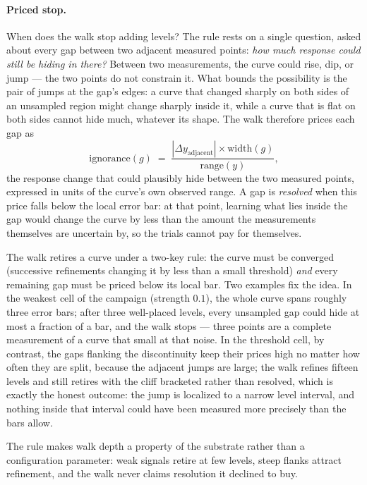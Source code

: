 \documentclass[11pt,a4paper]{article}
\begin{document}
\paragraph{Priced stop.}
When does the walk stop adding levels? The rule rests on a single
question, asked about every gap between two adjacent measured
points: \emph{how much response could still be hiding in there?}
Between two measurements, the curve could rise, dip, or jump ---
the two points do not constrain it. What bounds the possibility is
the pair of jumps at the gap's edges: a curve that changed sharply
on both sides of an unsampled region might change sharply inside
it, while a curve that is flat on both sides cannot hide much,
whatever its shape. The walk therefore prices each gap as
\begin{equation}
\text{ignorance}(g) \;=\; \frac{|\Delta y_{\text{adjacent}}| \times
\text{width}(g)}{\text{range}(y)} ,
\label{eq:ignorance}
\end{equation}
the response change that could plausibly hide between the two
measured points, expressed in units of the curve's own observed
range. A gap is \emph{resolved} when this price falls below the
local error bar: at that point, learning what lies inside the gap
would change the curve by less than the amount the measurements
themselves are uncertain by, so the trials cannot pay for
themselves.

The walk retires a curve under a two-key rule: the curve must be
converged (successive refinements changing it by less than a small
threshold) \emph{and} every remaining gap must be priced below its
local bar. Two examples fix the idea. In the weakest cell of the
campaign (strength $0.1$), the whole curve spans roughly three
error bars; after three well-placed levels, every unsampled gap
could hide at most a fraction of a bar, and the walk stops --- three
points are a complete measurement of a curve that small at that
noise. In the threshold cell, by contrast, the gaps flanking the
discontinuity keep their prices high no matter how often they are
split, because the adjacent jumps are large; the walk refines
fifteen levels and still retires with the cliff bracketed rather
than resolved, which is exactly the honest outcome: the jump is
localized to a narrow level interval, and nothing inside that
interval could have been measured more precisely than the bars
allow.

The rule makes walk depth a property of the substrate rather than
a configuration parameter: weak signals retire at few levels,
steep flanks attract refinement, and the walk never claims
resolution it declined to buy.
\end{document}
